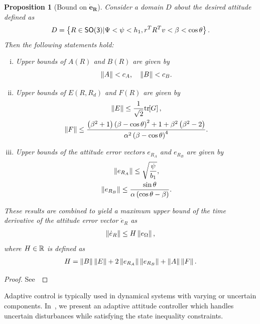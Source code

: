 \documentclass[fleqn]{IJCAS}  %
\newtheorem{prop}{Proposition}
\begin{document}
\begin{multicols}{2}
\begin{prop}[Bound on \( \bm{\dot{e}_R} \)]\label{prop:eR_dot_bound}
Consider a domain \( D \) about the desired attitude defined as
\begin{align}
	D = \left\{ R \in \mathsf{SO(3)} \vert \Psi < \psi < h_1, r^T R^T v < \beta < \cos \theta \right\}. \label{eqn:domain}
\end{align}
Then the following statements hold:
\begin{enumerate}[(i)]
	\item \label{item:prop_eR_dot_bound_AB} Upper bounds of \( A(R) \) and \( B(R) \) are given by
	\begin{gather}
		\left\| A \right\| < c_A  , \quad \left\| B \right\| < c_B . \label{eqn:AB_bound}
	\end{gather}
	\item \label{item:prop_eR_dot_bound_EF} Upper bounds of \( E(R,R_d) \) and \( F(R) \) are given by
	\begin{gather}
		\left\| E \right\| \leq \frac{1}{\sqrt{2}} \mathrm{tr}\negthickspace\left[ G \right]  , \label{eqn:E_bound} \\
		\left\| F \right\| \leq \frac{\left( \beta^2 + 1 \right)\left( \beta - \cos \theta \right)^2 + 1 + \beta^2 \left( \beta^2-2 \right)}{\alpha^2 \left( \beta-\cos \theta \right)^4} . \label{eqn:F_bound}
	\end{gather}
	\item Upper bounds of the attitude error vectors \( e_{R_A} \) and \( e_{R_B} \) are given by
	\begin{gather}
		\left\| e_{R_A} \right\| \leq \sqrt{\frac{\psi}{b_1}}, \label{eqn:eRA_bound} \\
		\left\| e_{R_B} \right\| \leq \frac{\sin\theta}{\alpha \left( \cos \theta - \beta \right)}. \label{eqn:eRB_bound}
	\end{gather}
\end{enumerate}
These results are combined to yield a maximum upper bound of the time derivative of the attitude error vector \( \dot{e}_R \) as
\begin{gather}
	\left\| \dot{e}_R \right\| \leq H \left\| e_\Omega \right\| ,\label{eqn:eR_bound}
\end{gather}
where  \( H \in \mathbb{R} \) is defined as
\begin{gather}
	H = \left\| B \right\| \left\| E \right\| + 2 \left\| e_{R_A} \right\| \left\| e_{R_B} \right\| + \left\| A \right\|\left\| F \right\|. \label{eqn:H}
\end{gather}
\end{prop}
\begin{proof}
See~
\end{proof}

Adaptive control is typically used in dynamical systems with varying or uncertain components.
In~, we present an adaptive attitude controller which handles uncertain disturbances while satisfying the state inequality constraints.


\end{multicols}
\end{document}
